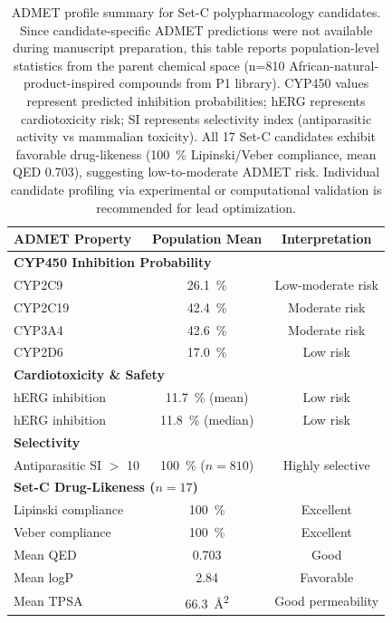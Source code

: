 \begin{table}[ht!]
\centering
\caption{ADMET profile summary for Set-C polypharmacology candidates. Since candidate-specific ADMET predictions were not available during manuscript preparation, this table reports population-level statistics from the parent chemical space (n=\num{810} African-natural-product-inspired compounds from P1 library). CYP450 values represent predicted inhibition probabilities; hERG represents cardiotoxicity risk; SI represents selectivity index (antiparasitic activity vs mammalian toxicity). All \num{17} Set-C candidates exhibit favorable drug-likeness (\qty{100}{\percent} Lipinski/Veber compliance, mean QED \num{0.703}), suggesting low-to-moderate ADMET risk. Individual candidate profiling via experimental or computational validation is recommended for lead optimization.}
\label{tab:admet}
\small
\begin{tabular}{lcc}
\toprule
ADMET Property & Population Mean & Interpretation \\
\midrule
\multicolumn{3}{l}{\textbf{CYP450 Inhibition Probability}} \\
CYP2C9 & \qty{26.1}{\percent} & Low-moderate risk \\
CYP2C19 & \qty{42.4}{\percent} & Moderate risk \\
CYP3A4 & \qty{42.6}{\percent} & Moderate risk \\
CYP2D6 & \qty{17.0}{\percent} & Low risk \\
\midrule
\multicolumn{3}{l}{\textbf{Cardiotoxicity \& Safety}} \\
hERG inhibition & \qty{11.7}{\percent} (mean) & Low risk \\
hERG inhibition & \qty{11.8}{\percent} (median) & Low risk \\
\midrule
\multicolumn{3}{l}{\textbf{Selectivity}} \\
Antiparasitic SI $>$ \num{10} & \qty{100}{\percent} (\(n=\num{810}\)) & Highly selective \\
\midrule
\multicolumn{3}{l}{\textbf{Set-C Drug-Likeness (\(n=\num{17}\))}} \\
Lipinski compliance & \qty{100}{\percent} & Excellent \\
Veber compliance & \qty{100}{\percent} & Excellent \\
Mean QED & \num{0.703} & Good \\
Mean logP & \num{2.84} & Favorable \\
Mean TPSA & \qty{66.3}{\angstrom\squared} & Good permeability \\
\bottomrule
\end{tabular}
\end{table}